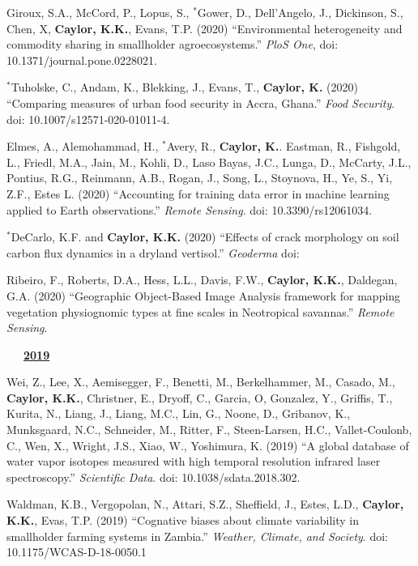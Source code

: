 \documentclass[10pt]{report}
\begin{document}
\begin{etaremune}
\item Giroux, S.A., McCord, P., Lopus, S., $^{*}$Gower, D., Dell’Angelo, J., Dickinson, S., Chen, X, \textbf{Caylor, K.K.}, Evans, T.P. (2020) ``Environmental heterogeneity and commodity sharing in smallholder agroecosystems.'' {\em PloS One}, doi: 10.1371/journal.pone.0228021.

\item  $^{*}$Tuholske, C., Andam, K., Blekking, J., Evans, T., \textbf{Caylor, K.} (2020) ``Comparing measures of urban food security in Accra, Ghana.'' {\em Food Security}. doi: 10.1007/s12571-020-01011-4.

\item Elmes, A., Alemohammad, H.,  $^{*}$Avery, R., \textbf{Caylor, K.}. Eastman, R., Fishgold, L., Friedl, M.A., Jain, M., Kohli, D., Laso Bayas, J.C., Lunga, D., McCarty, J.L., Pontius, R.G., Reinmann, A.B., Rogan, J., Song, L., Stoynova, H., Ye, S., Yi, Z.F., Estes L. (2020) ``Accounting for training data error in machine learning applied to Earth observations.'' {\em Remote Sensing}. doi: 10.3390/rs12061034.

\item  $^{*}$DeCarlo, K.F. and \textbf{Caylor, K.K.} (2020) ``Effects of crack morphology on soil carbon flux dynamics in a dryland vertisol.'' {\em Geoderma} doi: 

\item Ribeiro, F., Roberts, D.A., Hess, L.L., Davis, F.W., \textbf{Caylor, K.K.}, Daldegan, G.A. (2020) ``Geographic Object-Based Image Analysis framework for mapping vegetation physiognomic types at fine scales in Neotropical savannas.'' {\em Remote Sensing}. 

\mbox{\ \ \ \underline{\textbf{2019}}}

\item Wei, Z., Lee, X., Aemisegger, F., Benetti, M., Berkelhammer, M., Casado, M., \textbf{Caylor, K.K.}, Christner, E., Dryoff, C., Garcia, O, Gonzalez, Y., Griffis, T., Kurita, N., Liang, J., Liang, M.C., Lin, G., Noone, D., Gribanov, K., Munksgaard, N.C., Schneider, M., Ritter, F., Steen-Larsen, H.C., Vallet-Coulonb, C., Wen, X., Wright, J.S., Xiao, W., Yoshimura, K. (2019) ``A global database of water vapor isotopes measured with high temporal resolution infrared laser spectroscopy.'' {\em Scientific Data}. doi: 10.1038/sdata.2018.302.

\item Waldman, K.B., Vergopolan, N., Attari, S.Z., Sheffield, J., Estes, L.D., \textbf{Caylor, K.K.}, Evas, T.P. (2019) ``Cognative biases about climate variability in smallholder farming systems in Zambia.'' {\em Weather, Climate, and Society}. doi: 10.1175/WCAS-D-18-0050.1


\end{etaremune}
\end{document}
